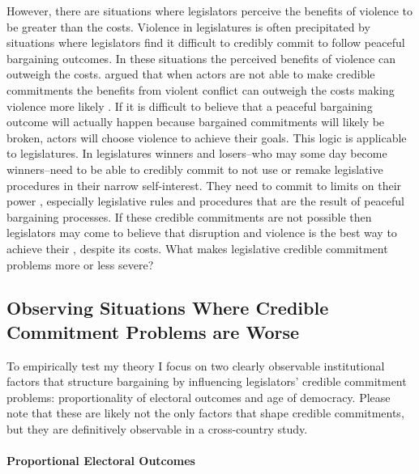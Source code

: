\documentclass[a4paper]{article}\usepackage[]{graphicx}\usepackage[]{color}
\begin{document}
However, there are situations where legislators perceive the benefits of violence to be greater than the costs. Violence in  legislatures is often precipitated by situations where legislators find it difficult to credibly commit to follow peaceful bargaining outcomes. In these situations the perceived benefits of violence can outweigh the costs.  \cite{Fearon1995} argued that when actors are not able to make credible commitments the benefits from violent conflict can outweigh the costs making violence more likely \cite[see also][]{Powell2006}. If it is difficult to believe that a peaceful bargaining outcome will actually happen because bargained commitments will likely be broken, actors will choose violence to achieve their goals. This logic is applicable to legislatures. In  legislatures winners and losers--who may some day become winners--need to be able to credibly commit to not use or remake legislative procedures in their narrow self-interest. They need to commit to limits on their power \citep{riker1982,Gaubatz1996}, especially legislative rules and procedures that are the result of peaceful bargaining processes. If these credible commitments are not possible then legislators may come to believe that disruption and violence is the best way to achieve their , despite its costs. What makes legislative credible commitment problems more or less severe?


\subsection*{Observing Situations Where Credible Commitment Problems are Worse}

To empirically test my theory I focus on two clearly observable institutional factors that structure bargaining by influencing legislators' credible commitment problems: proportionality of electoral outcomes and age of democracy. Please note that these are likely not the only factors that shape credible commitments, but they are definitively observable in a cross-country study.

\paragraph{Proportional Electoral Outcomes}
\end{document}
